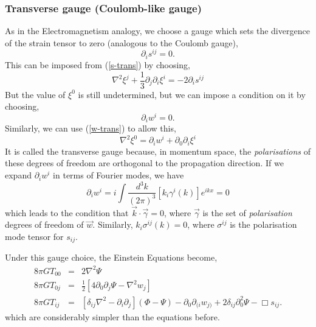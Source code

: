 \subsubsection{Transverse gauge (Coulomb-like gauge)}
As in the Electromagnetism analogy, we choose a gauge which sets the divergence of the strain tensor to zero (analogous to the Coulomb gauge), 
\begin{equation}\nonumber
    \partial_is^{ij}=0.
\end{equation}
This can be imposed from (\ref{s-trans}) by choosing, 
\begin{equation}\nonumber
    \nabla^2\xi^j + \frac{1}{3}\partial_j\partial_i\xi^i = -2\partial_is^{ij}
\end{equation}
But the value of $\xi^0$ is still undetermined, but we can impose a condition on it by choosing, 
\begin{equation}\nonumber
    \partial_iw^i = 0. 
\end{equation}
Similarly, we can use (\ref{w-trans}) to allow this,
\begin{equation}\nonumber
    \nabla^2\xi^0 = \partial_iw^i + \partial_0\partial_i\xi^i
\end{equation}
It is called the transverse gauge because, in momentum space, the \textit{polarisations} of these degrees of freedom are orthogonal to the propagation direction. If we expand $\partial_iw^i$ in terms of Fourier modes, we have
\begin{equation}\nonumber
    \partial_iw^i=i\int\frac{d^3k}{(2\pi)^3}[k_i\gamma^i(k)]e^{ikx}=0
\end{equation}
which leads to the condition that $\vec{k}\cdot \vec{\gamma}=0$, where $\vec{\gamma}$ is the set of \textit{polarisation} degrees of freedom of $\vec{w}$. Similarly, $k_{i}\sigma^{ij}(k)=0$, where $\sigma^{ij}$ is the polarisation mode tensor for $s_{ij}$.

Under this gauge choice, the Einstein Equations become, 
\begin{eqnarray*}
    8\pi GT_{00} &=& 2\nabla^2\Psi \\ 
    8\pi GT_{0j} &=& \frac{1}{2}\left[4\partial_0\partial_j\Psi - \nabla^2w_j\right] \\
    8\pi GT_{ij} &=& \left[\delta_{ij}\nabla^2 - \partial_i\partial_j\right](\Phi-\Psi) - \partial_0\partial_{(i}w_{j)} + 2\delta_{ij}\partial_0^2\Psi - \Box s_{ij}.
\end{eqnarray*}
which are considerably simpler than the equations before. 

